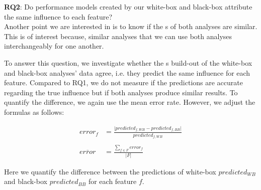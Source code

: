 \noindent \textbf{RQ2}: Do performance models created by our white-box and black-box attribute the same influence to each feature?\\

Another point we are interested in is to know if the {\perfInfluenceModel}s of both analyses are similar. 
This is of interest because, similar analyses that we can use both analyses interchangeably for one another.

To answer this question, we investigate whether the {\perfInfluenceModel}s build-out of the white-box and black-box analyses' data agree, i.e.
they predict the same influence for each feature. 
Compared to RQ1, we do not measure if the predictions are accurate regarding the true influence but if both analyses produce similar results. 
To quantify the difference, we again use the mean error rate. However, we adjust the formulas as follows:

\begin{align}
    error_f &= \frac{\lvert predicted_{f, WB} - predicted_{f, BB} \rvert}{predicted_{f, WB}} \label{equ:APE_RQ1} \\ \nonumber \\
    \overline{error}  &= \frac{\sum_{f \in F} error_f}{\lvert F \rvert} \label{equ:MAPE_RQ1}
\end{align}

Here we quantify the difference between the predictions of white-box $predicted_{WB}$ and black-box $predicted_{BB}$ for each feature $f$.\\


